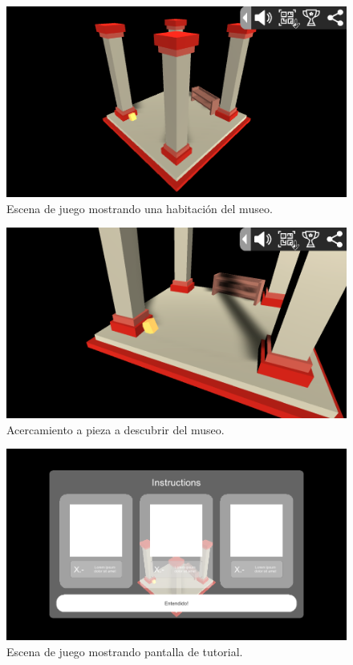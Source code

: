 \begin{figure}[H]
\centerline{\includegraphics[width=15cm]{imgs/Game_4.PNG}}
\caption{Escena de juego mostrando una habitación del museo.}
\label{game_4}
\end{figure}

\begin{figure}[H]
\centerline{\includegraphics[width=15cm]{imgs/Game_5.PNG}}
\caption{Acercamiento a pieza a descubrir del museo.}
\label{game_5}
\end{figure}

\begin{figure}[H]
\centerline{\includegraphics[width=15cm]{imgs/Game_3.PNG}}
\caption{Escena de juego mostrando pantalla de tutorial.}
\label{game_3}
\end{figure}